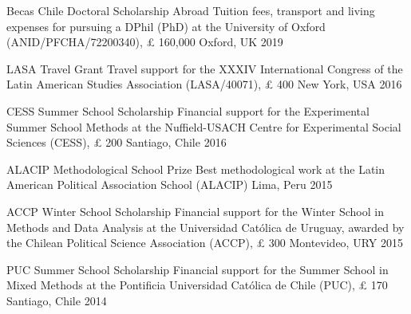 \vspace{1mm}

\begin{cvhonors}
\cvhonor
{Becas Chile Doctoral Scholarship Abroad} 
{Tuition fees, transport and living expenses for pursuing a DPhil (PhD) at the University of Oxford (ANID/PFCHA/72200340), {\pounds} 160,000}
{Oxford, UK}
{2019}
\end{cvhonors}

\vspace{1mm}

\begin{cvhonors}
\cvhonor
{LASA Travel Grant} 
{Travel support for the XXXIV International Congress of the Latin American Studies Association (LASA/40071), {\pounds} 400}
{New York, USA}
{2016}
\end{cvhonors}

\vspace{1mm}

\begin{cvhonors}
\cvhonor
{CESS Summer School Scholarship}
{Financial support for the Experimental Summer School Methods at the Nuffield-USACH Centre for Experimental Social Sciences (CESS), {\pounds} 200}
{Santiago, Chile}
{2016}
\end{cvhonors}

\vspace{1mm}

\begin{cvhonors}
\cvhonor
{ALACIP Methodological School Prize}
{Best methodological work at the Latin American Political Association School (ALACIP)}
{Lima, Peru}
{2015}
\end{cvhonors}

\vspace{1mm}

\begin{cvhonors}
\cvhonor
{ACCP Winter School Scholarship}
{Financial support for the Winter School in Methods and Data Analysis at the Universidad Cat\'olica de Uruguay, awarded by the Chilean Political Science Association (ACCP), {\pounds} 300}
{Montevideo, URY}
{ 2015}
\end{cvhonors}

\vspace{1mm}

\begin{cvhonors}
\cvhonor
{PUC Summer School Scholarship}
{Financial support for the Summer School in Mixed Methods at the Pontificia Universidad Cat\'olica de Chile (PUC), {\pounds} 170}
{Santiago, Chile}
{2014} 
\end{cvhonors}

